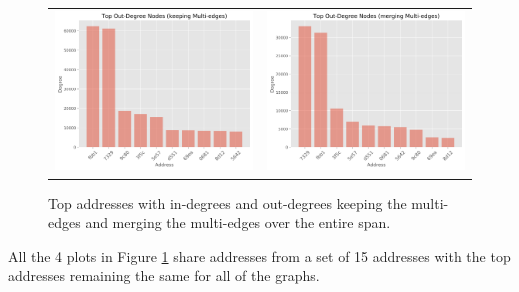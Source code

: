 \documentclass[sigconf]{acmart}
\begin{document}
\begin{figure}
\begin{tabular}{cc}
\includegraphics[scale=0.4]{Top_Out-Degree_Nodes_(keeping_Multi-edges).png}&
\includegraphics[scale=0.4]{Top_Out-Degree_Nodes_(merging_Multi-edges).png}\\
\end{tabular}
\caption{Top addresses with in-degrees and out-degrees keeping the multi-edges and merging the multi-edges over the entire span.}
\label{fig:inout-degrees}
\end{figure}
All the 4 plots in Figure \ref{fig:inout-degrees} share addresses from a set of 15 addresses with the top addresses remaining the same for all of the graphs.
\end{document}
